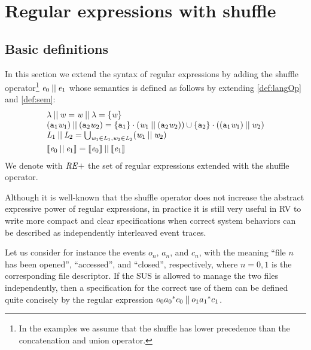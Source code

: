 \section{Regular expressions with shuffle}\label{sec:shuffle}

\subsection{Basic definitions}
In this section we extend the syntax of regular expressions by adding the shuffle operator\footnote{In the examples we assume that the shuffle has lower precedence than the concatenation and union operator.} $\mathit {e}_0\mathbin{||}\mathit {e}_1$ whose semantics is defined as follows by extending \cref{def:langOp} and \cref{def:sem}:
\[
 \begin{array}{l}
  \lambda \mathbin{||} \mathit {w} = \mathit {w} \mathbin{||} \lambda = \{\mathit {w}\}                                                                                                      \\
  (\mathtt {a}_1\mathit {w}_1) \mathbin{||} (\mathtt {a}_2\mathit {w}_2) = \{ \mathtt {a}_1  \} \mathbin{\cdot} (\mathit {w}_1 \mathbin{||} (\mathtt {a}_2\mathit {w}_2)) \cup \{\mathtt {a}_2\}\mathbin{\cdot}((\mathtt {a}_1\mathit {w}_1)\mathbin{||}\mathit {w}_2) \\
  \mathit {L}_1\mathbin{||}\mathit {L}_2=\bigcup_{\mathit {w}_1\in\mathit {L}_1,\mathit {w}_2\in\mathit {L}_2}(\mathit {w}_1\mathbin{||}\mathit {w}_2)                                                                     \\[1ex]
  \left\llbracket{\ensuremath{\mathit {e}}_0\mathbin{||}\ensuremath{\mathit {e}}_1}\right\rrbracket=\left\llbracket{\ensuremath{\mathit {e}}_0}\right\rrbracket\mathbin{||}\left\llbracket{\ensuremath{\mathit {e}}_1}\right\rrbracket
 \end{array}
\]
We denote with $\mathit {RE+}$ the set of regular expressions extended with the shuffle operator.

Although it is well-known that the shuffle operator does not increase the abstract expressive power of regular expressions, in practice it is still very useful in RV to write more compact and clear
specifications when correct system behaviors can be described as independently interleaved event traces.

Let us consider for instance the events $o_n$, $a_n$, and $c_n$, with the meaning
``file $n$ has been opened'', ``accessed'', and ``closed'', respectively, where $n=0,1$ is the corresponding file descriptor.
If the SUS is allowed to manage the two files independently, then a specification for the correct use of them can be defined quite concisely by the regular expression $o_0{a_0}^* c_0\mathbin{||} o_1{a_1}^* c_1$.

